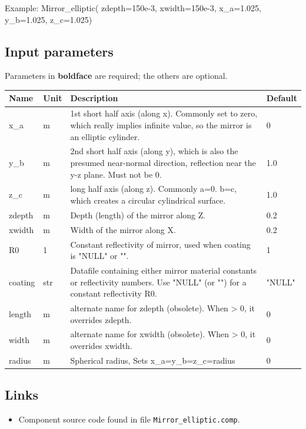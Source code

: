 Example: Mirror\_elliptic( zdepth=150e-3, xwidth=150e-3, x\_a=1.025, y\_b=1.025, z\_c=1.025)

\subsection*{Input parameters}
Parameters in \textbf{boldface} are required; the others are optional.

\begin{longtable}{p{}p{}p{}p{}}
\toprule
\textbf{Name} & \textbf{Unit} & \textbf{Description} & \textbf{Default} \\
\midrule
\endhead
x\_a & m & 1st short half axis (along x). Commonly set to zero, which really implies infinite value, so the mirror is an elliptic cylinder. & 0 \\
y\_b & m & 2nd short half axis (along y), which is also the presumed near-normal direction, reflection near the y-z plane. Must not be 0. & 1.0 \\
z\_c & m & long  half axis (along z). Commonly a=0. b=c, which creates a circular cylindrical surface. & 1.0 \\
zdepth & m & Depth (length) of the mirror along Z. & 0.2 \\
xwidth & m & Width of the mirror along X. & 0.2 \\
R0 & 1 & Constant reflectivity of mirror, used when coating is "NULL" or "". & 1 \\
coating & str & Datafile containing either mirror material constants or reflectivity numbers. Use "NULL" (or "") for a constant reflectivity R0. & "NULL" \\
length & m & alternate name for zdepth (obsolete). When \textgreater{} 0, it overrides zdepth. & 0 \\
width & m & alternate name for xwidth (obsolete). When \textgreater{} 0, it overrides xwidth. & 0 \\
radius & m & Spherical radius, Sets x\_a=y\_b=z\_c=radius & 0 \\
\bottomrule
\end{longtable}

\subsection*{Links}
\begin{itemize}
  \item Component source code found in file \texttt{Mirror\_elliptic.comp}.
\end{itemize}

